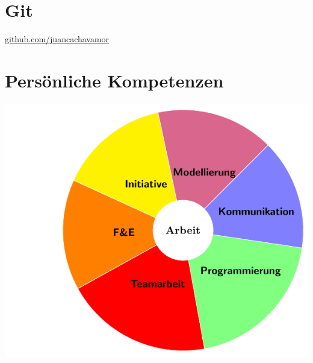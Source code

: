 \documentclass[a4paper]{cv-class}
\let\oldincludegraphics\includegraphics
\renewcommand\includegraphics[2][]{%
  \oldincludegraphics[#1,max width=10cm,max height=\textheight]{#2}
}
\begin{document}
\begin{aside}
  \section{Git}
  	\underline{\href{https://github.com/JuanCaChavaMor}{\footnotesize{github.com/juancachavamor}}}
    ~
   \section{Persönliche Kompetenzen}
 
  \hspace{-.8cm}
        \includegraphics[width=\textwidth,height=\textheight,keepaspectratio]{img/arbeit-cv.pdf}
   ~
  

\end{aside}
\end{document}
